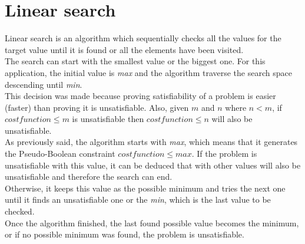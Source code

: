 \section{Linear search}

Linear search is an algorithm which sequentially checks all the values for the target value until it is found or all the elements have been visited.\\
The search can start with the smallest value or the biggest one. For this application, the initial value is \emph{max} and the algorithm traverse the search space descending until \emph{min}.\\
This decision was made because proving satisfiability of a problem is easier (faster) than proving it is unsatisfiable. Also, given $m$ and $n$ where $n < m$, if $cost function \leq m$ is unsatisfiable then $cost function \leq n$ will also be unsatisfiable. \\
As previously said, the algorithm starts with \emph{max}, which means that it generates the Pseudo-Boolean constraint $cost function \leq max$. If the problem is unsatisfiable with this value, it can be deduced that with other values will also be unsatisfiable and therefore the search can end.\\
Otherwise, it keeps this value as the possible minimum and tries the next one until it finds an unsatisfiable one or the \emph{min}, which is the last value to be checked.\\
Once the algorithm finished, the last found possible value becomes the minimum, or if no possible minimum was found, the problem is unsatisfiable.

